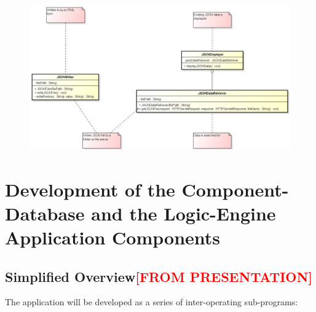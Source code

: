 \begin{figure}[H]
\centering
\includegraphics[width=5in]{Resources//Design_Diagrams//Class_Backend site java controller.png}
\caption{}
\label{}
\end{figure}

































\iffalse

\section{Development of the Component-Database and the Logic-Engine Application Components}
\label{sec:DevelopmentOfTheComponentDatabaseAndTheLogicEngineApplicationComponents}


\subsection{Simplified Overview\textcolor{red}{[FROM PRESENTATION]}}
\label{sec:Methodology:SimplifiedOverview}
The application will be developed as a series of inter-operating sub-programs:

